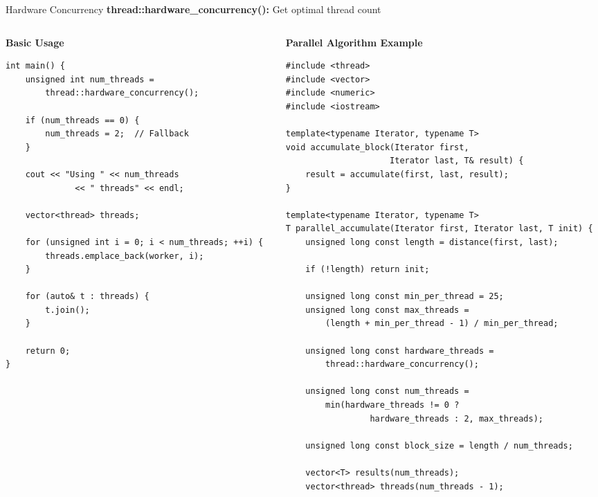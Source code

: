 \begin{frame}[fragile]{Hardware Concurrency}
	\textbf{thread::hardware\_concurrency():} Get optimal thread count

	\begin{columns}
		\begin{column}{0.5\textwidth}
			\textbf{Basic Usage}
			\begin{verbatim}
int main() {
    unsigned int num_threads =
        thread::hardware_concurrency();

    if (num_threads == 0) {
        num_threads = 2;  // Fallback
    }

    cout << "Using " << num_threads
              << " threads" << endl;

    vector<thread> threads;

    for (unsigned int i = 0; i < num_threads; ++i) {
        threads.emplace_back(worker, i);
    }

    for (auto& t : threads) {
        t.join();
    }

    return 0;
}
			\end{verbatim}
		\end{column}
		\begin{column}{0.5\textwidth}
			\textbf{Parallel Algorithm Example}
			\begin{verbatim}
#include <thread>
#include <vector>
#include <numeric>
#include <iostream>

template<typename Iterator, typename T>
void accumulate_block(Iterator first,
                     Iterator last, T& result) {
    result = accumulate(first, last, result);
}

template<typename Iterator, typename T>
T parallel_accumulate(Iterator first, Iterator last, T init) {
    unsigned long const length = distance(first, last);

    if (!length) return init;

    unsigned long const min_per_thread = 25;
    unsigned long const max_threads =
        (length + min_per_thread - 1) / min_per_thread;

    unsigned long const hardware_threads =
        thread::hardware_concurrency();

    unsigned long const num_threads =
        min(hardware_threads != 0 ?
                 hardware_threads : 2, max_threads);

    unsigned long const block_size = length / num_threads;

    vector<T> results(num_threads);
    vector<thread> threads(num_threads - 1);


\end{verbatim}
\end{column}
\end{columns}
\end{frame}

